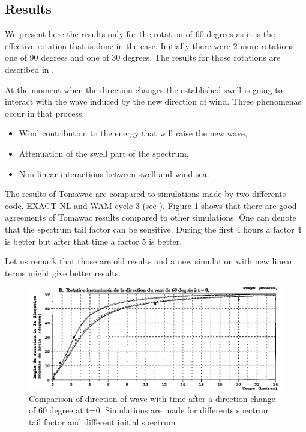 %
%
\subsection{Results}
%
We present here the results only for the rotation of 60 degrees as it is the effective rotation that is done in the case. Initially there were 2 more rotations one of 90 degrees and one of 30 degrees. The results for those rotations are described in \cite{Benoit1996_2}.

At the moment when the direction changes the established swell is going to interact with the wave induced by the new direction of wind. Three phenomenas occur in that process.
\begin {itemize}
\item Wind contribution to the energy that will raise the new wave,
\item Attenuation of the swell part of the spectrum,
\item Non linear interactions between swell and wind sea.
\end{itemize}

The results of Tomawac are compared to simulations made by two differents code. EXACT-NL and WAM-cycle 3 (see \cite{Vanvledder1990}). Figure  \ref{resturnwind} shows that there are good agreements of Tomawac results compared to other simulations. One can denote that the spectrum tail factor can be sensitive. During the first 4 hours a factor 4 is better but after that time a factor 5 is better.

Let us remark that those are old results and a new simulation with new linear terms might give better results.

\begin{figure} [!h]
\centering
\includegraphics[scale = 0.45]{resuTW60.png}
 \caption{Comparison of direction of wave with time after a direction change of 60 degree at t=0. Simulations are made for differents spectrum tail factor and different initial spectrum}
\label{resturnwind}
\end{figure}

